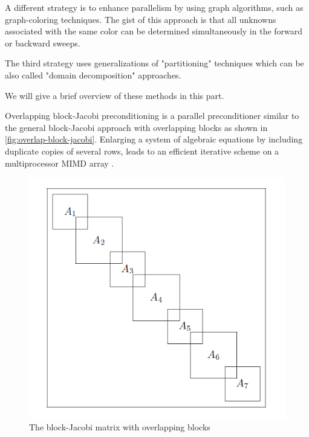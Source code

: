A different strategy is to enhance parallelism by using graph algorithms, such as graph-coloring techniques. The gist of this approach is that all unknowns associated with the same color can be determined simultaneously in the forward or backward sweeps.

The third strategy uses generalizations of "partitioning" techniques which can be also called "domain decomposition" approaches.

We will give a brief overview of these methods in this part.

Overlapping block-Jacobi preconditioning is a parallel preconditioner similar to the general block-Jacobi approach with overlapping blocks as shown in \autoref{fig:overlap-block-jacobi}. Enlarging a system of algebraic equations by including duplicate copies of several rows, leads to an efficient iterative scheme on a multiprocessor MIMD array \cite{WAIT1988325}. 
\begin{figure}[h!]
    \centering
    \includegraphics[width=\linewidth]{figures/block-jacobi.png}
    \caption{The block-Jacobi matrix with overlapping blocks \cite{doi:10.1137/1.9780898718003}}
    \label{fig:overlap-block-jacobi}
\end{figure}


